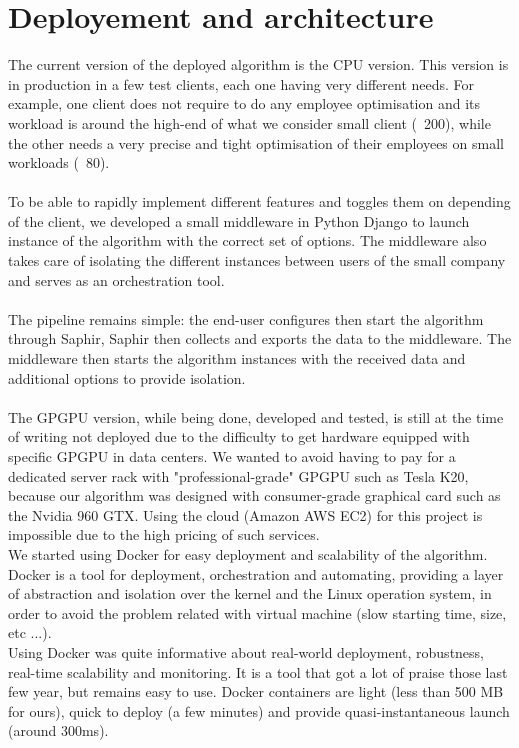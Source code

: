 \documentclass[12pt]{memoir}
\begin{document}
\section{Deployement and architecture}

The current version of the deployed algorithm is the CPU version. This version is in
production in a few test clients, each one having very different needs. For example,
one client does not require to do any employee optimisation and its workload is
around the high-end of what we consider small client (~200), while the other needs a
very precise and tight optimisation of their employees on small workloads (~80).\\
\\
To be able to rapidly implement different features and toggles them on depending of the client,
we developed a small middleware in Python Django to launch instance of the algorithm
with the correct set of options. The middleware also takes care of isolating the
different instances between users of the small company and serves as an orchestration
tool.\\
\\
The pipeline remains simple: the end-user configures then start the algorithm through
Saphir, Saphir then collects and exports the data to the middleware. The middleware
then starts the algorithm instances with the received data and additional options to
provide isolation.\\
\\
The GPGPU version, while being done, developed and tested, is still at the time of
writing not deployed due to the difficulty to get hardware equipped with specific
GPGPU in data centers. We wanted to avoid having to pay for a dedicated server rack
with "professional-grade" GPGPU such as Tesla K20, because our algorithm was
designed with consumer-grade graphical card such as the Nvidia 960 GTX. Using the
cloud (Amazon AWS EC2) for this project is impossible due to the high pricing
of such services.
\\
We started using Docker for easy deployment and scalability of the algorithm. Docker
is a tool for deployment, orchestration and automating, providing a layer of
abstraction and isolation over the kernel and the Linux operation system, in order
to avoid the problem related with virtual machine (slow starting time, size, etc
...). \\
Using Docker was quite informative about real-world deployment, robustness,
real-time scalability and monitoring. It is a tool that got a lot of praise those
last few year, but remains easy to use. Docker containers are light (less than 500
MB for ours), quick to deploy (a few minutes) and provide quasi-instantaneous launch
(around 300ms).
\end{document}
